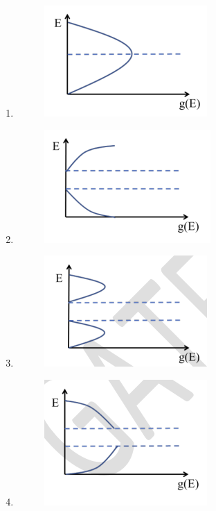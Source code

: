 \documentclass[12pt]{article}
\begin{document}
\begin{enumerate}
\begin{enumerate}
\item \begin{figure}[H]
    \centering
    \includegraphics[width=0.5\columnwidth]{figs/ass5_c_q54_a.png}
    \caption{}
    \label{fig:placeholder}
\end{figure}
\item \begin{figure}[H]
    \centering
    \includegraphics[width=0.5\columnwidth]{figs/ass5_c_q54_b.png}
    \caption{}
    \label{fig:placeholder}
\end{figure}
\item \begin{figure}[H]
    \centering
    \includegraphics[width=0.5\columnwidth]{figs/ass5_c_q54_c.png}
    \caption{}
    \label{fig:placeholder}
\end{figure}
\item \begin{figure}[H]
    \centering
    \includegraphics[width=0.5\columnwidth]{figs/ass5_c_q54_d.png}
    \caption{}
    \label{fig:placeholder}
\end{figure}
\end{enumerate}


\end{enumerate}
\end{document}
